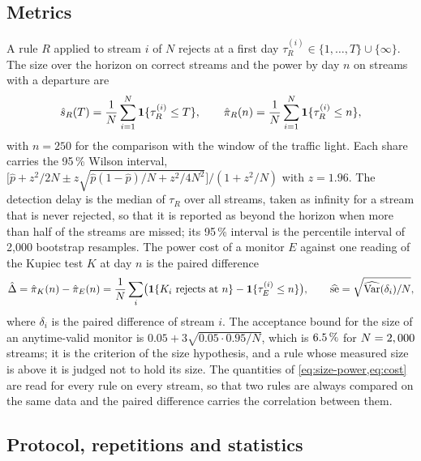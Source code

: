 \subsection{Metrics}
\label{sec:design-metrics}

A rule $R$ applied to stream $i$ of $N$ rejects at a first day $\tau_R^{(i)}\in\{1,\dots,T\}\cup\{\infty\}$. The size over the horizon on correct streams and the power by day $n$ on streams with a departure are
\begin{equation}
\hat s_R(T)=\frac1N\sum_{i=1}^N\mathbf{1}\{\tau_R^{(i)}\le T\},\qquad \hat\pi_R(n)=\frac1N\sum_{i=1}^N\mathbf{1}\{\tau_R^{(i)}\le n\},
\label{eq:size-power}
\end{equation}
with $n=250$ for the comparison with the window of the traffic light. Each share carries the 95\,\% Wilson interval, $\bigl[\hat p+z^2/2N\pm z\sqrt{\hat p(1-\hat p)/N+z^2/4N^2}\bigr]/(1+z^2/N)$ with $z=1.96$.
The detection delay is the median of $\tau_R$ over all streams, taken as infinity for a stream that is never rejected, so that it is reported as beyond the horizon when more than half of the streams are missed; its 95\,\% interval is the percentile interval of 2,000 bootstrap resamples. The power cost of a monitor $E$ against one reading of the Kupiec test $K$ at day $n$ is the paired difference
\begin{equation}
\hat\Delta=\hat\pi_K(n)-\hat\pi_E(n)=\frac1N\sum_{i}\bigl(\mathbf{1}\{K_i\text{ rejects at }n\}-\mathbf{1}\{\tau_E^{(i)}\le n\}\bigr),\qquad \widehat{\mathrm{se}}=\sqrt{\widehat{\operatorname{Var}}(\delta_i)/N},
\label{eq:cost}
\end{equation}
where $\delta_i$ is the paired difference of stream $i$. The acceptance bound for the size of an anytime-valid monitor is $0.05+3\sqrt{0.05\cdot0.95/N}$, which is $6.5\,\%$ for $N=2,000$ streams; it is the criterion of the size hypothesis, and a rule whose measured size is above it is judged not to hold its size. The quantities of \cref{eq:size-power,eq:cost} are read for every rule on every stream, so that two rules are always compared on the same data and the paired difference carries the correlation between them.

\subsection{Protocol, repetitions and statistics}
\label{sec:design-protocol}


